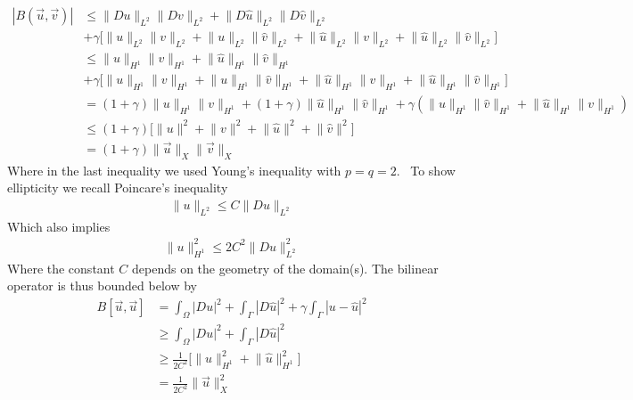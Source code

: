 \documentclass[11pt, norsk, a4paper]{article}
\newcommand\norm[1]{\lVert#1\rVert}
\begin{document}
\begin{align*}
    |B(\vec{u}, \vec{v})| &\leq \norm{Du}_{L^2}\norm{Dv}_{L^2}+ \norm{D\hat{u}}_{L^2}\norm{D\hat{v}}_{L^2} \\ &+\gamma\Bigr[\norm{u}_{L^2}\norm{v}_{L^2}+\norm{u}_{L^2}\norm{\hat{v}}_{L^2}+\norm{\hat{u}}_{L^2}\norm{v}_{L^2}+\norm{\hat{u}}_{L^2}\norm{\hat{v}}_{L^2}\Bigr] \\
    & \leq \norm{u}_{H^1}\norm{v}_{H^1}+ \norm{\hat{u}}_{H^1}\norm{\hat{v}}_{H^1} \\ &+\gamma\Bigr[\norm{u}_{H^1}\norm{v}_{H^1}+\norm{u}_{H^1}\norm{\hat{v}}_{H^1}+\norm{\hat{u}}_{H^1}\norm{v}_{H^1}+\norm{\hat{u}}_{H^1}\norm{\hat{v}}_{H^1}\Bigr] \\
    &= (1+\gamma) \norm{u}_{H^1}\norm{v}_{H^1}+(1+\gamma)\norm{\hat{u}}_{H^1}\norm{\hat{v}}_{H^1}+\gamma(\norm{u}_{H^1}\norm{\hat{v}}_{H^1}+\norm{\hat{u}}_{H^1}\norm{v}_{H^1}) \\
    &\leq (1+\gamma) \Bigr[\norm{u}^2+\norm{v}^2+\norm{\hat{u}}^2+\norm{\hat{v}}^2\Bigr]\\
    & = (1+\gamma)\norm{\vec{u}}_X\norm{\vec{v}}_X
\end{align*}
Where in the last inequality we used Young's inequality with $p = q = 2$. \
To show ellipticity we recall Poincare's inequality 
\begin{align*}
    \norm{u}_{L^2} \leq C\norm{Du}_{L^2}
\end{align*}
Which also implies 
\begin{align*}
 \norm{u}^2_{H^1} \leq 2C^2\norm{Du}^2_{L^2}
\end{align*}
Where the constant $C$ depends on the geometry of the domain(s). 
The bilinear operator is thus bounded below by 
\begin{align*}
    B[\vec{u}, \vec{u}] &= \int_{\Omega} |Du|^2 +\int_\Gamma|D\hat{u}|^2+\gamma \int_\Gamma |u-\hat{u}|^2 \\
   & \geq \int_{\Omega} |Du|^2 +\int_\Gamma|D\hat{u}|^2 \\
   & \geq \frac{1}{2C^2} \Bigr[\norm{u}_{H^1}^2+\norm{\hat{u}}_{H^1}^2\Bigr]\\
   & =  \frac{1}{2C^2} \norm{\vec{u}}_X^2 
\end{align*}
\end{document}
